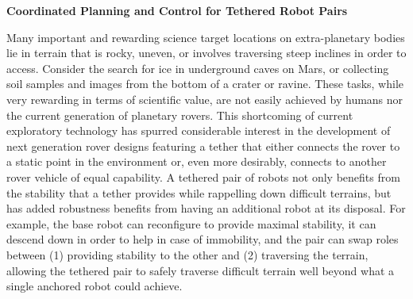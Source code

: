 \documentclass[12pt]{article}
\begin{document}
\newpage

\begin{center}
{\bf Coordinated Planning and Control for Tethered Robot Pairs }

\end{center}

Many important and rewarding science target locations on extra-planetary bodies lie in terrain that is 
rocky, uneven, or involves traversing steep inclines in order to access. Consider the search for ice in 
underground caves on Mars, or collecting soil samples and images from the bottom of a crater or ravine. 
These tasks, while very rewarding in terms of scientific value, are not easily achieved by humans nor 
the current generation of planetary rovers. This shortcoming of current exploratory technology has spurred 
considerable interest in the development of next generation rover designs featuring a tether that either 
connects the rover to a static point in the environment or, even more desirably, connects to another rover 
vehicle of equal capability. A tethered pair of robots not only benefits from the stability that a tether 
provides while rappelling down difficult terrains, but has added robustness benefits from having an additional robot 
at its disposal. For example, the base robot can reconfigure to provide maximal stability, it can descend down in order to help 
in case of immobility, and the pair can swap roles between (1) providing stability to the other and (2) traversing the 
terrain, allowing the tethered pair to safely traverse difficult terrain well beyond what a single anchored robot 
could achieve. 
\end{document}
